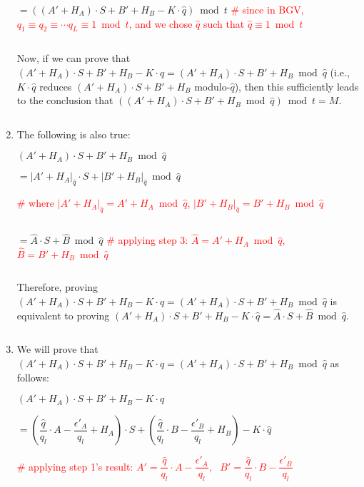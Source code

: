 \begin{enumerate}
$= ((A' + H_A)\cdot S + B' + H_B - K\cdot \hat{q}) \bmod t$ \textcolor{red}{ \# since in BGV, $q_1\equiv q_2\equiv \cdots q_L \equiv 1 \bmod t$, and we chose $\hat{q}$ such that $\hat{q} \equiv 1 \bmod t$}

$ $

Now, if we can prove that $(A' + H_A)\cdot S + B' + H_B - K\cdot \hat{q} = (A' + H_A)\cdot S + B' + H_B \bmod \hat{q}$ (i.e., $K\cdot\hat{q}$ reduces $(A' + H_A)\cdot S + B' + H_B$ modulo-$\hat{q}$), then this sufficiently leads to the conclusion that $((A' + H_A)\cdot S + B' + H_B \bmod \hat{q}) \bmod t = M$. 

$ $

\item The following is also true: 

$(A' + H_A)\cdot S + B' + H_B \bmod \hat{q}$

$ = |A' + H_A|_{\hat{q}}\cdot S + |B' + H_B|_{\hat{q}} \bmod \hat{q}$ 

\textcolor{red}{\# where $|A' + H_A|_{\hat{q}} = A' + H_A \bmod \hat{q}$, \text{ } $|B' + H_B|_{\hat{q}} = B' + H_B \bmod \hat{q}$} 

$ $

$ = \hat{A}\cdot S + \hat{B} \bmod \hat{q}$ \textcolor{red}{ \# applying step 3: $\hat{A} = A' + H_A \bmod \hat{q}$, \text{ } $\hat{B} = B' + H_B \bmod \hat{q}$}

$ $

Therefore, proving $(A' + H_A)\cdot S + B' + H_B - K\cdot \hat{q} = (A' + H_A)\cdot S + B' + H_B \bmod \hat{q}$ is equivalent to proving $(A' + H_A)\cdot S + B' + H_B - K\cdot \hat{q} = \hat{A}\cdot S + \hat{B} \bmod \hat{q}$. 

$ $


\item We will prove that $(A' + H_A)\cdot S + B' + H_B - K\cdot \hat{q} = (A' + H_A)\cdot S + B' + H_B \bmod \hat{q}$ as follows: 

$(A' + H_A)\cdot S + B' + H_B - K\cdot \hat{q}$ 


$ = (\dfrac{\hat{q}}{q_{l}}\cdot A - \dfrac{\epsilon'_A}{q_{l}} + H_A)\cdot S + (\dfrac{\hat{q}}{q_{l}}\cdot B - \dfrac{\epsilon'_B}{q_{l}} + H_B) - K\cdot \hat{q}$ 

\textcolor{red}{ \# applying step 1's result: $A' = \dfrac{\hat{q}}{q_{l}}\cdot A - \dfrac{\epsilon'_A}{q_{l}}, \text{ } B' = \dfrac{\hat{q}}{q_{l}}\cdot B - \dfrac{\epsilon'_B}{q_{l}}$}

$ $

$ $


\end{enumerate}
